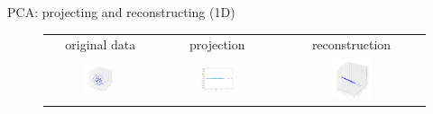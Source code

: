 \begin{frame}{PCA: projecting and reconstructing (1D)}
\begin{figure}
\begin{tabular}{ccc}
\small{original data} & \small{projection} & \small{reconstruction}\\
\includegraphics[width=0.3\textwidth]{img/pca/original1.pdf}&
\includegraphics[width=0.3\textwidth]{img/pca/proj1.pdf}&
\includegraphics[width=0.3\textwidth]{img/pca/reconstr1.pdf}
\end{tabular}
\end{figure}
\end{frame}